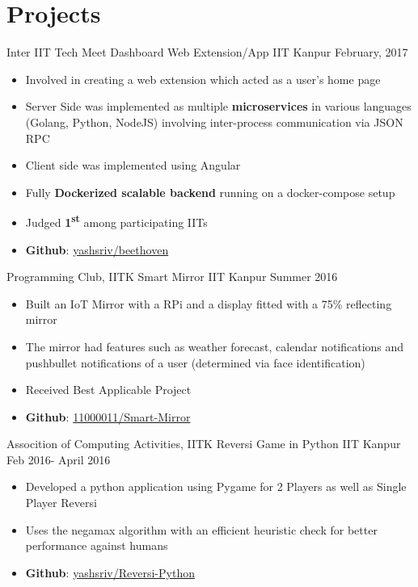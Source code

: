 \section*{\sc Projects}
\vspace{-2mm}
\hrulefill
\vspace{.2cm}

\cventry
{Inter IIT Tech Meet}
{Dashboard Web Extension/App}
{IIT Kanpur}
{February, 2017}
{
  \begin{itemize}
  \item Involved in creating a web extension which acted as a user’s home page
  \item Server Side was implemented as multiple \textbf{microservices} in
    various languages (Golang, Python, NodeJS) involving inter-process
    communication via JSON RPC
  \item Client side was implemented using Angular
  \item Fully \textbf{Dockerized scalable backend} running on a docker-compose
    setup \\
  \item Judged \textbf{1\textsuperscript{st}} among participating IITs
  \item \textbf{Github}:
    \href{https://github.com/yashsriv/beethoven}{yashsriv/beethoven}
  \end{itemize}
}

\cventry
{Programming Club, IITK}
{Smart Mirror}
{IIT Kanpur}
{Summer 2016}
{
  \begin{itemize}
  \item Built an IoT Mirror with a RPi and a display fitted with a 75\% reflecting mirror
    \item The mirror had features such as weather forecast, calendar notifications and pushbullet notifications of a user (determined via face identification)
    \item Received Best Applicable Project
    \item \textbf{Github}:
      \href{http://github.com/11000011/Smart-Mirror}{11000011/Smart-Mirror}
  \end{itemize}
}

\cventry
{Assocition of Computing Activities, IITK}
{Reversi Game in Python}
{IIT Kanpur}
{Feb 2016- April 2016}
{
  \begin{itemize}
    \item Developed a python application using Pygame for 2 Players as well as Single Player Reversi
    \item Uses the negamax algorithm with an efficient heuristic check for better performance against humans
    \item \textbf{Github}:
      \href{http://github.com/yashsriv/Reversi-Python}{yashsriv/Reversi-Python} 
  \end{itemize}
}

